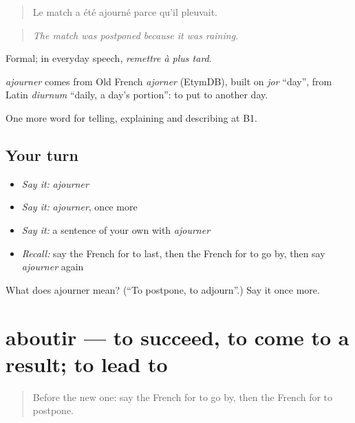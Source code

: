 \begin{quote}
Le match a été ajourné parce qu'il pleuvait.
\end{quote}

\begin{quote}
\emph{The match was postponed because it was raining.}
\end{quote}

Formal; in everyday speech, \emph{remettre à plus tard}.

\begin{cousinweb}
\emph{ajourner} comes from Old French \emph{ajorner} (EtymDB), built on \emph{jor} \textquotedblleft{}day\textquotedblright{}, from Latin \emph{diurnum} \textquotedblleft{}daily, a day's portion\textquotedblright{}: to put to another day.
\end{cousinweb}

\begin{grammarlens}[title={What you've built}]
One more word for telling, explaining and describing at B1.
\end{grammarlens}

\subsection*{Your turn}
\begin{itemize}
\raggedright
  \item \emph{Say it:} \emph{ajourner}
  \item \emph{Say it:} \emph{ajourner}, once more
  \item \emph{Say it:} a sentence of your own with \emph{ajourner}
  \item \emph{Recall:} say the French for to last, then the French for to go by, then say \emph{ajourner} again
\end{itemize}

\begin{tcolorbox}[breakable,colback=teal!4,colframe=teal!35!black,title={Before you move on}]
What does ajourner mean? (\textquotedblleft{}To postpone, to adjourn\textquotedblright{}.) Say it once more.
\end{tcolorbox}
\section[aboutir]{aboutir — to succeed, to come to a result; to lead to}

\label{lesson:FR-C275-aboutir}



\begin{quote}
Before the new one: say the French for to go by, then the French for to postpone.
\end{quote}

